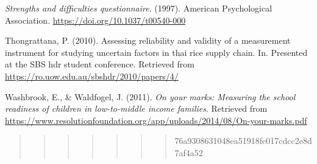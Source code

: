 \documentclass[
  english,
  man]{apa6}
\newlength{\cslhangindent}
\newenvironment{cslreferences}%
  {\setlength{\parindent}{0pt}%
  \everypar{\setlength{\hangindent}{\cslhangindent}}\ignorespaces}%
  {\par}
\begin{document}
\begin{cslreferences}
\leavevmode\hypertarget{ref-goodman1997}{}%
\emph{Strengths and difficulties questionnaire}. (1997). American Psychological Association. \url{https://doi.org/10.1037/t00540-000}

\leavevmode\hypertarget{ref-thongrattana2010}{}%
Thongrattana, P. (2010). Assessing reliability and validity of a measurement instrument for studying uncertain factors in thai rice supply chain. In. Presented at the SBS hdr student conference. Retrieved from \url{https://ro.uow.edu.au/sbshdr/2010/papers/4/}

\leavevmode\hypertarget{ref-washbrook2011}{}%
Washbrook, E., \& Waldfogel, J. (2011). \emph{On your marks: Measuring the school readiness of children in low-to-middle income families}. Retrieved from \url{https://www.resolutionfoundation.org/app/uploads/2014/08/On-your-marks.pdf}
\end{cslreferences}

\endgroup

\begin{quote}
\begin{quote}
\begin{quote}
\begin{quote}
\begin{quote}
\begin{quote}
\begin{quote}
76a9308631048ea51918fe017cdcc2e8d7af4a52
\end{quote}
\end{quote}
\end{quote}
\end{quote}
\end{quote}
\end{quote}
\end{quote}
\end{document}
